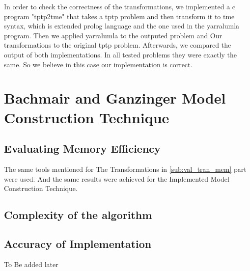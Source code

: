 In order to check the correctness of the transformations, we implemented a c program "tptp2tme" that takes a tptp problem and then transform it to tme syntax, which is extended prolog language and the one used in the yarralumla program. Then we applied yarralumla to the outputed problem and Our transformations to the original tptp problem. Afterwards, we compared the output of both implementations. In all tested problems they were exactly the same. So we believe in this case our implementation is correct.


\section{Bachmair and Ganzinger Model Construction Technique}
\subsection{Evaluating Memory Efficiency}
The same tools mentioned for The Transformations in \ref{sub:val_tran_mem} part were used. And the same results were achieved for the Implemented Model Construction Technique.



\subsection{Complexity of the algorithm}



\subsection{Accuracy of Implementation}
To Be added later 